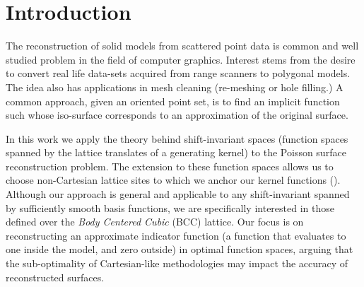 \section{Introduction}

\label{sec:intro}
The reconstruction of solid models from scattered point data is common and well studied problem in the field of computer graphics. Interest stems from the desire to convert real life data-sets acquired from range scanners to polygonal models. The idea also has applications in mesh cleaning (re-meshing or hole filling.) A common approach, given an oriented point set, is to find an implicit function such whose iso-surface corresponds to an approximation of the original surface.

In this work we apply the theory behind shift-invariant spaces (function spaces spanned by the lattice translates of a generating kernel) to the Poisson surface reconstruction problem. The extension to these function spaces allows us to choose non-Cartesian lattice sites to which we anchor our kernel functions (). Although our approach is general and applicable to any shift-invariant spanned by sufficiently smooth basis functions, we are specifically interested in those defined over the \emph{Body Centered Cubic} (BCC) lattice. Our focus is on reconstructing an approximate indicator function (a function that evaluates to one inside the model, and zero outside) in optimal function spaces, arguing that the sub-optimality of Cartesian-like methodologies may impact the accuracy of reconstructed surfaces.

